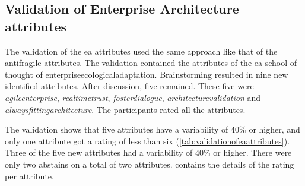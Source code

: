 \subsection{Validation of Enterprise Architecture attributes}
\label{sub:validationofenterprisearchitectureattributes}
The validation of the \gls{ea} \glspl{attribute} used the same approach like that of the \gls{antifragile} \glspl{attribute}. The validation contained the \glspl{attribute} of the \gls{ea} school of thought of \gls{enterpriseecologicaladaptation}. Brainstorming resulted in nine new identified \glspl{attribute}. After discussion, five remained. These five were \textit{\gls{agileenterprise}}, \textit{\gls{realtimetrust}}, \textit{\gls{fosterdialogue}}, \textit{\gls{architecturevalidation}} and \textit{\gls{alwaysfittingarchitecture}}. The participants rated all the \glspl{attribute}.

The validation shows that five \glspl{attribute} have a variability of 40\% or higher, and only one \gls{attribute} got a rating of less than six (\cref{tab:validationofeaattributes}). Three of the five new attributes had a variability of 40\% or higher. There were only two abstains on a total of two attributes.  contains the details of the rating per \gls{attribute}.
\begin{table}[H]
	\centering
	\caption[Validation of Enterprise Architecture attributes]{Validation of Enterprise Architecture attributes}
	\label{tab:validationofeaattributes}%
\end{table}%

